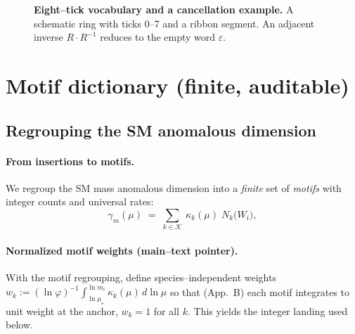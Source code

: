 \documentclass[epjc3]{svjour3}
\begin{document}
\begin{figure}[t]
  \centering
  \caption{\textbf{Eight--tick vocabulary and a cancellation example.} A schematic ring with ticks 0--7 and a ribbon segment. An adjacent inverse $R\cdot R^{-1}$ reduces to the empty word $\varepsilon$.}
  \label{fig:tick-vocab}
\end{figure}

\section{Motif dictionary (finite, auditable)}

\subsection{Regrouping the SM anomalous dimension}

\paragraph{From insertions to motifs.}
We regroup the SM mass anomalous dimension into a \emph{finite} set of \emph{motifs} with integer counts and universal rates:
\begin{equation}
  \gamma_m(\mu)
  \;=\;
  \sum_{k\in\mathcal{K}} \ \kappa_k(\mu)\; N_k\!\bigl(W_i\bigr),
  \label{eq:motif-regrouping}
\end{equation}

\paragraph{Normalized motif weights (main--text pointer).}
With the motif regrouping, define species--independent weights
\(
  w_k := (\ln\varphi)^{-1}\int_{\ln\mu_\star}^{\ln m_i}\!\kappa_k(\mu)\,d\ln\mu
\)
so that (App.~B) each motif integrates to unit weight at the anchor, $w_k=1$ for all $k$. This yields the integer landing used below.
\end{document}
